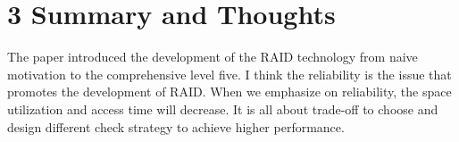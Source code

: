 \documentclass[12pt]{article}
\begin{document}
 \section*{3 Summary and Thoughts}
 The paper introduced the development of the RAID technology from naive motivation to the comprehensive level five. I think the reliability is the issue that promotes the development of RAID. When we emphasize on reliability, the space utilization and access time will decrease. It is all about trade-off to choose and design different check strategy to achieve higher performance. 
\end{document}
